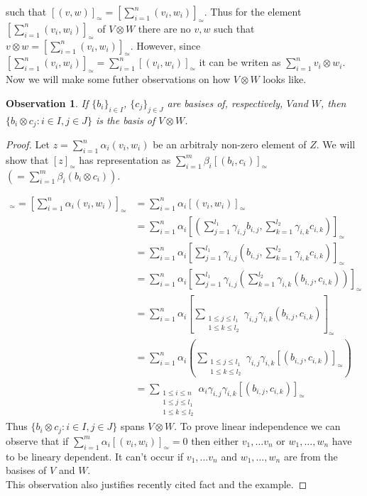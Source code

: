 \documentclass[a4paper, 12pt]{report}
\newtheorem{observation}{Observation}
\begin{document}
such that $ [(v,w)]_\simeq = \left[\displaystyle\sum^n_{i=1}(v_i,w_i)\right]_\simeq$.
Thus for the element $\left[\displaystyle\sum^n_{i=1}(v_i,w_i)\right]_\simeq$ of $V\otimes W$
there are no $v, w$ such that $v \otimes w = \left[\displaystyle\sum^n_{i=1}(v_i,w_i)\right]_\simeq$.
However, since $\left[\displaystyle\sum^n_{i=1}(v_i,w_i)\right]_\simeq =
\displaystyle\sum^n_{i=1}[(v_i,w_i)]_\simeq$ it can be writen as
$\displaystyle\sum^n_{i=1}v_i \otimes w_i$. \\
Now we will make some futher observations on how $V \otimes W$ looks like.
\begin{observation}
\label{observation:1}
If $\{b_i\}_{i \in I}$, $\{c_j\}_{j \in J}$ are basises of, respectively, $V$and $W$,
then $\{b_i \otimes c_j : i \in I, j \in J\}$ is the basis of $V \otimes W$.
\end{observation}
\begin{proof}
Let $z = \displaystyle\sum^n_{i = 1}\alpha_i(v_i,w_i)$ be an arbitraly non-zero element of $Z$. We will show
that $[z]_\simeq$ has representation as $\displaystyle\sum^m_{i = 1}\beta_i [(b_i,c_i)]_\simeq$
$\left(=\displaystyle\sum^m_{i = 1}\beta_i(b_i \otimes c_i)\right)$.

\begin{align*}
[z]_\simeq = \left[\sum^n_{i = 1}\alpha_i(v_i,w_i)\right]_\simeq &=
\sum^n_{i = 1}\alpha_i[(v_i,w_i)]_\simeq \\
&= \sum^n_{i = 1}\alpha_i\left[\left(\sum^{l_1}_{j=1}\gamma_{i,j}b_{i,j},
\sum^{l_2}_{k=1}\gamma_{i,k}c_{i,k}\right)\right]_\simeq \\
&= \sum^n_{i = 1}\alpha_i\left[\sum^{l_1}_{j=1}\gamma_{i,j}\left(b_{i,j},
\sum^{l_2}_{k=1}\gamma_{i,k}c_{i,k}\right)\right]_\simeq \\
&= \sum^n_{i = 1}\alpha_i\left[\sum^{l_1}_{j=1}\gamma_{i,j}\left(\sum^{l_2}_{k=1}\gamma_{i,k}
\left(b_{i,j},c_{i,k}\right)\right)\right]_\simeq \\
&= \sum^n_{i = 1}\alpha_i\left[\sum_{\substack{1 \leq j \leq l_1 \\ 1 \leq k \leq l_2}}
\gamma_{i,j}\gamma_{i,k}(b_{i,j}, c_{i,k})\right]_\simeq \\
&= \sum^n_{i = 1}\alpha_i\left(\sum_{\substack{1 \leq j \leq l_1 \\ 1 \leq k \leq l_2}}
\gamma_{i,j}\gamma_{i,k}[(b_{i,j}, c_{i,k})]_\simeq\right) \\
&= \sum_{\substack{1 \leq i \leq n \\1 \leq j \leq l_1 \\ 1 \leq k \leq l_2}}
\alpha_i\gamma_{i,j}\gamma_{i,k}[(b_{i,j}, c_{i,k})]_\simeq
\end{align*}
Thus $\{b_i \otimes c_j : i \in I, j \in J\}$ spans $V \otimes W$. To prove linear independence we can
observe that if $\displaystyle\sum^m_{i = 1}\alpha_i [(v_i,w_i)]_\simeq = 0$
then either $v_1, \dots v_n$ or $w_1, \dots, w_n$ have to be lineary dependent. It can't occur if
$v_1, \dots v_n$ and $w_1, \dots, w_n$ are from the basises of $V$ and $W$.\\
This observation also justifies
recently cited fact and the example.
\end{proof}
\end{document}
